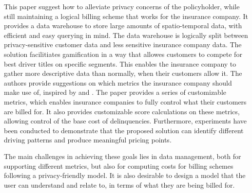 This paper suggest how to alleviate privacy concerns of the policyholder, while still maintaining a logical billing scheme that works for the insurance company. It provides a data warehouse to store large amounts of spatio-temporal data, with efficient and easy querying in mind. The data warehouse is logically split between privacy-sensitive customer data and less sensitive insurance company data. The solution facilitiates gamification in a way that allowes customers to compete for best driver titles on specific segments. This enables the insurance company to gather more descriptive data than normally, when their customers allow it. The authors provide suggestions on which metrics the insurance company should make use of, inspired by \citet{art:insurtelematics} and \citet{art:smartphonemonitor}. The paper provides a series of customizable metrics, which enables insurance companies to fully control what their customers are billed for. It also provides customizable score calculations on these metrics, allowing control of the base cost of delinquencies. Furthermore, experiments have been conducted to demonstrate that the proposed solution can identify different driving patterns and produce meaningful pricing points.

The main challenges in achieving these goals lies in data management, both for supporting different metrics, but also for computing costs for billing schemes following a privacy-friendly model. It is also desirable to design a model that the user can understand and relate to, in terms of what they are being billed for.